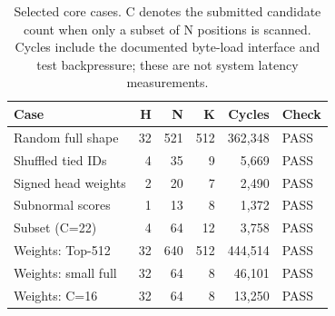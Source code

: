 \begin{table}[t]
\centering\caption{Selected core cases. C denotes the submitted candidate count when only a subset of N positions is scanned. Cycles include the documented byte-load interface and test backpressure; these are not system latency measurements.}
\label{tab:core}
\small
\begin{tabular}{lrrrrl}\toprule
Case & H & N & K & Cycles & Check\\\midrule
Random full shape & 32 & 521 & 512 & 362,348 & PASS\\
Shuffled tied IDs & 4 & 35 & 9 & 5,669 & PASS\\
Signed head weights & 2 & 20 & 7 & 2,490 & PASS\\
Subnormal scores & 1 & 13 & 8 & 1,372 & PASS\\
Subset (C=22) & 4 & 64 & 12 & 3,758 & PASS\\
Weights: Top-512 & 32 & 640 & 512 & 444,514 & PASS\\
Weights: small full & 32 & 64 & 8 & 46,101 & PASS\\
Weights: C=16 & 32 & 64 & 8 & 13,250 & PASS\\
\bottomrule\end{tabular}
\end{table}
